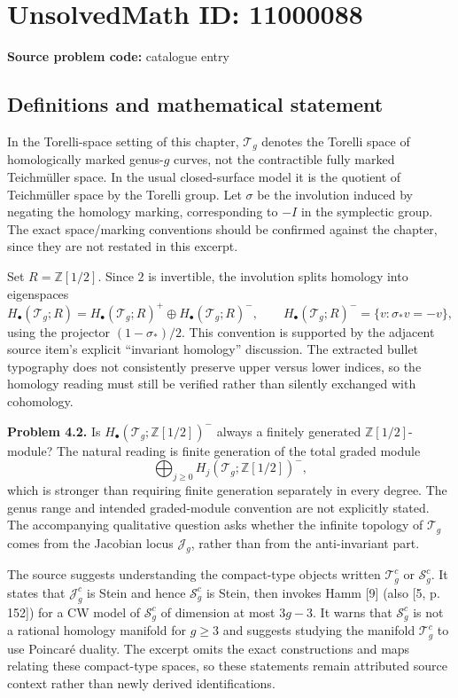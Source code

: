 \documentclass[11pt]{article}
\newcommand{\Z}{\mathbb{Z}}
\begin{document}
\section*{UnsolvedMath ID: 11000088}
\textbf{Source problem code:} catalogue entry
\subsection{Definitions and mathematical statement}
In the Torelli-space setting of this chapter, $\mathcal T_g$ denotes the Torelli space of homologically marked genus-$g$ curves, not the contractible fully marked Teichm\"uller space. In the usual closed-surface model it is the quotient of Teichm\"uller space by the Torelli group. Let $\sigma$ be the involution induced by negating the homology marking, corresponding to $-I$ in the symplectic group. The exact space/marking conventions should be confirmed against the chapter, since they are not restated in this excerpt.

Set $R=\Z[1/2]$. Since $2$ is invertible, the involution splits homology into eigenspaces
\[
 H_\bullet(\mathcal T_g;R)=H_\bullet(\mathcal T_g;R)^+\oplus H_\bullet(\mathcal T_g;R)^-,\qquad
 H_\bullet(\mathcal T_g;R)^-=\{v:\sigma_*v=-v\},
\]
using the projector $(1-\sigma_*)/2$. This convention is supported by the adjacent source item's explicit ``invariant homology'' discussion. The extracted bullet typography does not consistently preserve upper versus lower indices, so the homology reading must still be verified rather than silently exchanged with cohomology.

\textbf{Problem 4.2.} Is $H_\bullet(\mathcal T_g;\Z[1/2])^-$ always a finitely generated $\Z[1/2]$-module? The natural reading is finite generation of the total graded module
\[
 \bigoplus_{j\ge0}H_j(\mathcal T_g;\Z[1/2])^-,
\]
which is stronger than requiring finite generation separately in every degree. The genus range and intended graded-module convention are not explicitly stated. The accompanying qualitative question asks whether the infinite topology of $\mathcal T_g$ comes from the Jacobian locus $\mathcal J_g$, rather than from the anti-invariant part.

The source suggests understanding the compact-type objects written $\mathcal T_g^c$ or $\mathcal S_g^c$. It states that $\mathcal J_g^c$ is Stein and hence $\mathcal S_g^c$ is Stein, then invokes Hamm [9] (also [5, p. 152]) for a CW model of $\mathcal S_g^c$ of dimension at most $3g-3$. It warns that $\mathcal S_g^c$ is not a rational homology manifold for $g\ge3$ and suggests studying the manifold $\mathcal T_g^c$ to use Poincar\'e duality. The excerpt omits the exact constructions and maps relating these compact-type spaces, so these statements remain attributed source context rather than newly derived identifications.
\end{document}
